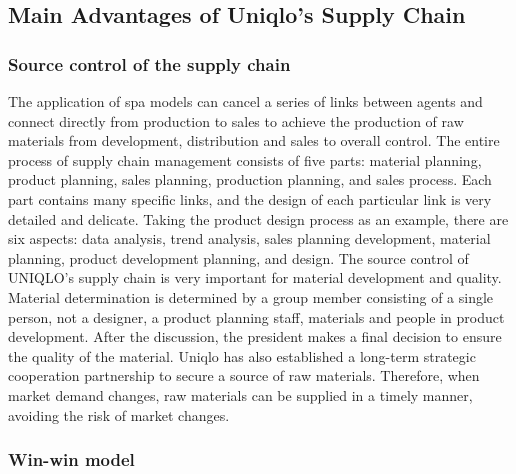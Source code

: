\documentclass[12pt,]{article}
\begin{document}
\hypertarget{main-advantages-of-uniqlos-supply-chain}{%
\subsection{Main Advantages of Uniqlo's Supply
Chain}\label{main-advantages-of-uniqlos-supply-chain}}

\hypertarget{source-control-of-the-supply-chain}{%
\subsubsection{Source control of the supply
chain}\label{source-control-of-the-supply-chain}}

The application of spa models can cancel a series of links between
agents and connect directly from production to sales to achieve the
production of raw materials from development, distribution and sales to
overall control. The entire process of supply chain management consists
of five parts: material planning, product planning, sales planning,
production planning, and sales process. Each part contains many specific
links, and the design of each particular link is very detailed and
delicate. Taking the product design process as an example, there are six
aspects: data analysis, trend analysis, sales planning development,
material planning, product development planning, and design. The source
control of UNIQLO's supply chain is very important for material
development and quality. Material determination is determined by a group
member consisting of a single person, not a designer, a product planning
staff, materials and people in product development. After the
discussion, the president makes a final decision to ensure the quality
of the material. Uniqlo has also established a long-term strategic
cooperation partnership to secure a source of raw materials. Therefore,
when market demand changes, raw materials can be supplied in a timely
manner, avoiding the risk of market changes.

\hypertarget{win-win-model}{%
\subsubsection{Win-win model}\label{win-win-model}}
\end{document}
